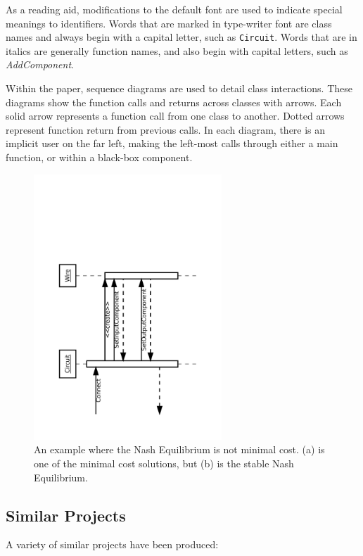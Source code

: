 \documentclass{article}
\newcommand{\ClassName}[1]{\texttt{#1}}
\newcommand{\FunctionName}[1]{\textit{#1}}
\begin{document}
As a reading aid, modifications to the default font are used to indicate special meanings to identifiers. Words that are marked in type-writer font are class names and always begin with a capital letter, such as \ClassName{Circuit}. Words that are in italics are generally function names, and also begin with capital letters, such as \FunctionName{AddComponent}.

Within the paper, sequence diagrams are used to detail class interactions. These diagrams show the function calls and returns across classes with arrows. Each solid arrow represents a function call from one class to another. Dotted arrows represent function return from previous calls. In each diagram, there is an implicit user on the far left, making the left-most calls through either a main function, or within a black-box component.

\begin{figure}[H]
    \begin{center}
        \includegraphics[angle=270,width=200pt]{imgs/ComponentConnectionInteraction.pdf}
    \end{center}
    \caption{An example where the Nash Equilibrium is not minimal cost.
        (a) is one of the minimal cost solutions, but (b) is the stable Nash
        Equilibrium.}
\end{figure}

\subsection{Similar Projects}

A variety of similar projects have been produced:
\end{document}
